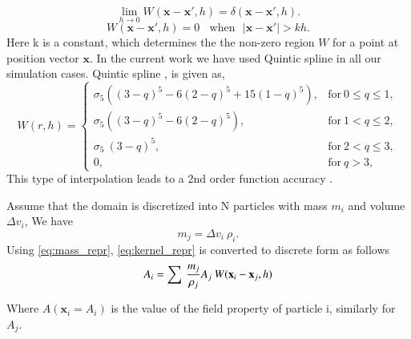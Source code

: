 \begin{equation}
  \label{eq:kernel_delta}
  \lim_{h \to 0} W(\boldsymbol{x} - \boldsymbol{x}', h) = \delta(\boldsymbol{x} - \boldsymbol{x}', h).
\end{equation}
\begin{equation}
  \label{eq:compact_support}
  W(\boldsymbol{x} - \boldsymbol{x}', h) = 0 \>\>\>\>    \text{when}  \>\>\> |\boldsymbol{x} - \boldsymbol{x}'| > kh.
\end{equation}
Here k is a constant, which determines the the non-zero region $W$ for a point
at position vector $\boldsymbol{x}$. In the current work we have used Quintic
spline in all our simulation cases. Quintic spline \citep{edac-sph:cf:2019}, is
given as,
\begin{equation}
  \label{eq:quintic_spline}
  W(r, h) =
  \begin{cases}
    \sigma_5\left( (3-q)^5 - 6(2-q)^5 + 15(1-q)^5 \right), & \textrm{for} \ 0\leq q \leq 1,\\
    \sigma_5\left( (3-q)^5 - 6(2-q)^5 \right), & \textrm{for} \ 1 <  q \leq 2,\\
    \sigma_5 \ (3-q)^5 , & \textrm{for} \ 2 < q \leq 3,\\
    0, & \textrm{for} \ q>3,
  \end{cases}
\end{equation}
This type of interpolation leads to a 2nd order function accuracy
\citep{fatehi2011error}.

Assume that the domain is discretized into N particles with mass
$m_i$ and volume $\Delta v_i$, We have
\begin{equation}
  \label{eq:mass_repr}
  m_j = \Delta v_i \> \rho_i.
\end{equation}
Using \eqref{eq:mass_repr}, \eqref{eq:kernel_repr} is converted to
discrete form as follows
\begin{equation}
  \label{eq:discrete_form}
  A_i = \sum\> \frac{m_j}{\rho_j} A_j\> W(\mathbf{x}_i - \mathbf{x}_j, h)
\end{equation}

Where $A(\boldsymbol{x}_i = A_i)$ is the value of the field property of particle
i, similarly for $A_j$.

